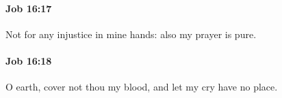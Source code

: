 		\paragraph{Job 16:17} %
			\label{JOB-16-17}

			Not for any injustice in mine hands: also my prayer is pure.


		\paragraph{Job 16:18} %
			\label{JOB-16-18}

			O earth, cover not thou my blood, and let my cry have no place.


